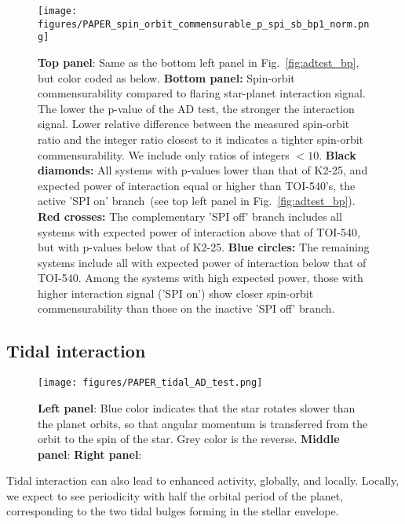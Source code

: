 \documentclass[twocolumn]{aastex631}
\begin{document}
\begin{figure}[t]
    \begin{centering}
        \texttt{[image: figures/PAPER\_spin\_orbit\_commensurable\_p\_spi\_sb\_bp1\_norm.png]}
        \caption{
           \textbf{Top panel}: Same as the bottom left panel in Fig.~\ref{fig:adtest_bp}, but color coded as below. \textbf{Bottom panel:} Spin-orbit commensurability compared to flaring star-planet interaction signal. The lower the p-value of the AD test, the stronger the interaction signal. Lower relative difference between the measured spin-orbit ratio and the integer ratio closest to it indicates a tighter spin-orbit commensurability. We include only ratios of integers $<10$. \textbf{Black diamonds:} All systems with p-values lower than that of K2-25, and expected power of interaction equal or higher than TOI-540's, the active 'SPI on' branch~(see top left panel in Fig.~\ref{fig:adtest_bp}). \textbf{Red crosses:} The complementary 'SPI off' branch includes all systems with expected power of interaction above that of TOI-540, but with p-values below that of K2-25. \textbf{Blue circles:} The remaining systems include all with expected power of interaction below that of TOI-540. Among the systems with high expected power, those with higher interaction signal ('SPI on') show closer spin-orbit commensurability than those on the inactive 'SPI off' branch.
        }
        \label{fig:spinorbit}
    \end{centering}
\end{figure}

\subsection{Tidal interaction}
\begin{figure*}[t]
    \begin{centering}
        \texttt{[image: figures/PAPER\_tidal\_AD\_test.png]}
        \caption{
           \textbf{Left panel}: Blue color indicates that the star rotates slower than the planet orbits, so that angular momentum is transferred from the orbit to the spin of the star. Grey color is the reverse. \textbf{Middle panel}: \textbf{Right panel}: 
        }
        \label{fig:tidal}
    \end{centering}
\end{figure*}


Tidal interaction can also lead to enhanced activity, globally, and locally. Locally, we expect to see periodicity with half the orbital period of the planet, corresponding to the two tidal bulges forming in the stellar envelope. 
\end{document}
